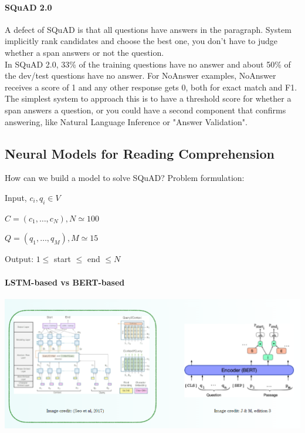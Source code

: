 \documentclass[10pt]{report}
\begin{document}
\paragraph{SQuAD 2.0} A defect of SQuAD is that all questions have answers in the paragraph. System implicitly rank candidates and choose the best one, you don't have to judge whether a span answers or not the question.\\
In SQuAD 2.0, 33\% of the training questions have no answer and about 50\% of the dev/test questions have no answer. For NoAnswer examples, NoAnswer receives a score of 1 and any other response gets 0, both for exact match and F1.\\
The simplest system to approach this is to have a threshold score for whether a span answers a question, or you could have a second component that confirms answering, like Natural Language Inference or "Answer Validation".
\subsection{Neural Models for Reading Comprehension}
How can we build a model to solve SQuAD? Problem formulation:
\begin{list}{}{}
	\item Input, $c_i,q_i\in V$
	\begin{list}{}{}
		\item $C=(c_1,\ldots,c_N), N\simeq 100$
		\item $Q=(q_1,\ldots,q_M), M\simeq 15$
	\end{list}
	\item Output: $1\leq$ start $\leq$ end $\leq N$
\end{list}
\paragraph{LSTM-based vs BERT-based}
\begin{center}
	\includegraphics[scale=0.33]{123.png}
\end{center}
\end{document}
